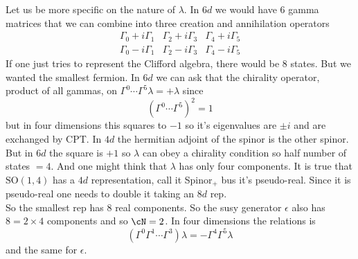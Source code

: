 \documentclass[11pt]{article}
\theoremstyle{definition}
\numberwithin{equation}{section}
\newcommand*\SO{\mathrm{SO}}
\begin{document}
Let us be more specific on the nature of $\lambda$. In $6d$ we would have $6$ gamma matrices that we can combine into three creation and annihilation operators
\begin{equation}
\begin{array}{ccc}
	\Gamma_{0}+i\Gamma_{1}&\Gamma_{2}+i\Gamma_{3}&\Gamma_{4}+i\Gamma_{5}\\
	\Gamma_{0}-i\Gamma_{1}&\Gamma_{2}-i\Gamma_{3}&\Gamma_{4}-i\Gamma_{5}	
\end{array}
\end{equation}
If one just tries to represent the Clifford algebra, there would be $8$ states. But we wanted the smallest fermion. In $6d$ we can ask that the chirality operator, product of all gammas, on $\Gamma^{0}\cdots\Gamma^{5}\lambda=+\lambda$ since 
\begin{equation}
	(\Gamma^{0}\cdots\Gamma^{5})^{2}=1
\end{equation}
but in four dimensions this squares to $-1$ so it's eigenvalues are $\pm i$ and are exchanged by CPT. In $4d$ the hermitian adjoint of the spinor is the other spinor. But in $6d$ the square is $+1$ so $\lambda$ can obey a chirality condition so half number of states $=4$. And one might think that $\lambda$ has only four components. It is true that $\SO(1,4)$ has a $4d$ representation, call it Spinor$_{+}$ bus it's pseudo-real. Since it is pseudo-real one needs to double it taking an $8d$ rep.\\
So the smallest rep has $8$ real components. So the susy generator $\epsilon$ also has $8=2\times 4$ components and so $\cN=2$. In four dimensions the relations is 
\begin{equation}
	(\Gamma^{0}\Gamma^{1}\cdots\Gamma^{3})\lambda=-\Gamma^{4}\Gamma^{5}\lambda
\end{equation}
and the same for $\epsilon$.
\end{document}

